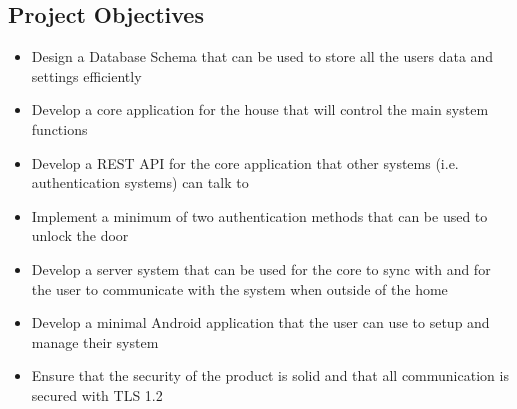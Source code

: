 \subsection{Project Objectives}
\begin{itemize}
	\item Design a Database Schema that can be used to store all the users data and settings efficiently 
	\item Develop a core application for the house that will control the main system functions
	\item Develop a REST API for the core application that other systems (i.e. authentication systems) can talk to
	\item Implement a minimum of two authentication methods that can be used to unlock the door
	\item Develop a server system that can be used for the core to sync with and for the user to communicate with the system when outside of the home
	\item Develop a minimal Android application that the user can use to setup and manage their system
	\item Ensure that the security of the product is solid and that all communication is secured with TLS 1.2
\end{itemize}


